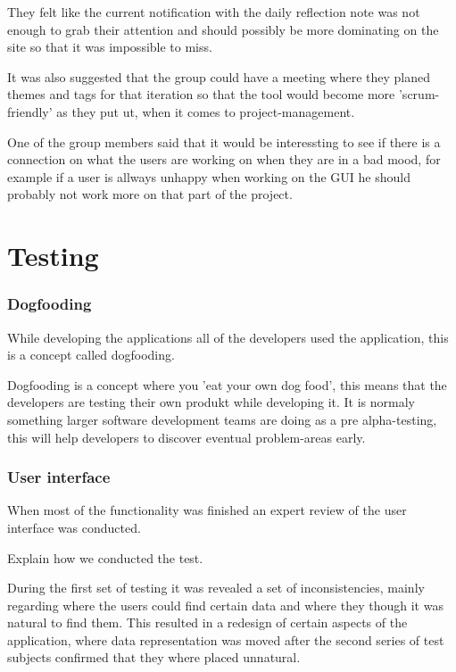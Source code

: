 They felt like the current notification with the daily reflection note was not enough to grab their attention and should possibly be more dominating on the site so that it was impossible to miss.

It was also suggested that the group could have a meeting where they planed themes and tags for that iteration so that the tool would become more 'scrum-friendly' as they put ut, when it comes to project-management.

One of the group members said that it would be interessting to see if there is a connection on what the users are working on when they are in a bad mood, for example if a user is allways unhappy when working on the GUI he should probably not work more on that part of the project.

\section{Testing}
\subsubsection{Dogfooding}
While developing the applications all of the developers used the application, this is a concept called dogfooding.

Dogfooding is a concept where you 'eat your own dog food', this means that the developers are testing their own produkt while developing it. It is normaly something larger software development teams are doing as a pre alpha-testing, this will help developers to discover eventual problem-areas early.

\subsubsection{User interface}
When most of the functionality was finished an expert review of the user interface was conducted.

Explain how we conducted the test.

During the first set of testing it was revealed a set of inconsistencies, mainly regarding where the users could find certain data and where they though it was natural to find them. 
This resulted in a redesign of certain aspects of the application, where data representation was moved after the second series of test subjects confirmed that they where placed unnatural.